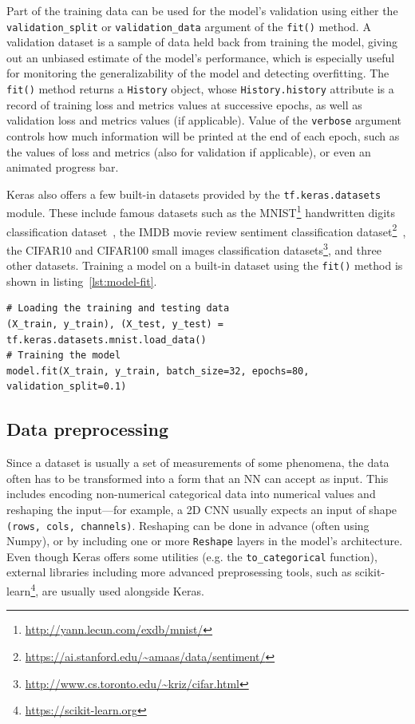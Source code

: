 Part of the training data can be used for the model's validation using either the \texttt{validation\_split}
or \texttt{validation\_data} argument of the \texttt{fit()} method. A validation dataset is a sample of data
held back from training the model, giving out an unbiased estimate of the model's performance,  which is especially
useful for monitoring the generalizability of the model and detecting overfitting.
The \texttt{fit()} method returns a \texttt{History} object, whose \texttt{History.history} attribute is a record of training loss
and metrics values at successive epochs, as well as validation loss and metrics values (if applicable).
Value of the \texttt{verbose} argument controls how much information will be printed at the end of each epoch,
such as the values of loss and metrics (also for validation if applicable), or even an animated progress bar.

Keras also offers a few built-in datasets provided by the \texttt{tf.keras.datasets} module.
These include famous datasets such as the MNIST\footnote{\url{http://yann.lecun.com/exdb/mnist/}}
handwritten digits classification dataset~\cite{deng2012mnist}, the IMDB movie review
sentiment classification
dataset\footnote{\url{https://ai.stanford.edu/~amaas/data/sentiment/}}~\cite{maas-EtAl:2011:ACL-HLT2011},
the CIFAR10 and CIFAR100 small images classification datasets\footnote{\url{http://www.cs.toronto.edu/~kriz/cifar.html}},
and three other datasets. Training a model on a built-in dataset using the \texttt{fit()} method is shown in listing~\ref{lst:model-fit}.

\begin{lstlisting}[caption={Training a Keras model on the built-in MNIST handwritten digits classification datasets using
the \texttt{Model}'s \texttt{fit()} method.}, label={lst:model-fit}]
# Loading the training and testing data
(X_train, y_train), (X_test, y_test) = tf.keras.datasets.mnist.load_data()
# Training the model
model.fit(X_train, y_train, batch_size=32, epochs=80, validation_split=0.1)
\end{lstlisting}


\subsection*{Data preprocessing}
\label{data-preprocessing-subsection}
Since a dataset is usually a set of measurements of some phenomena, the data often has to be transformed
into a form that an NN can accept as input. This includes encoding non-numerical categorical data into numerical
values and reshaping the input---for example, a 2D CNN usually expects an input of shape \texttt{(rows, cols, channels)}.
Reshaping can be done in advance (often using Numpy), or by including one or more \texttt{Reshape} layers in the model's
architecture. Even though Keras offers some utilities (e.g. the \texttt{to\_categorical} function),
external libraries including more advanced preprosessing tools, such as
scikit-learn\footnote{\url{https://scikit-learn.org}}, are usually used alongside Keras.

